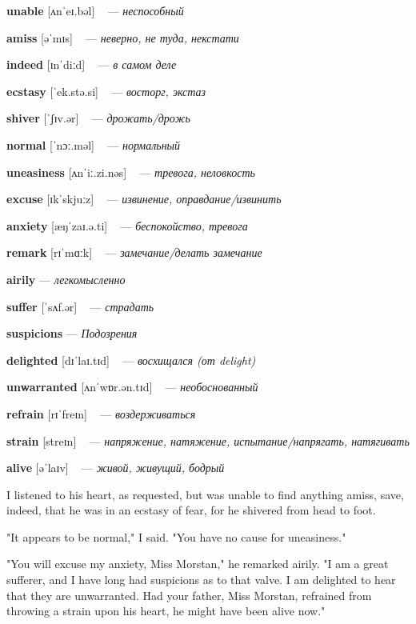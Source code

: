 \documentclass[a4paper,oneside,12pt]{amsart}
\begin{document}
{\large 

 {\bf unable } [ʌnˈeɪ.bəl] ~ --- \emph{ неспособный }

{\bf amiss } [əˈmɪs] ~ --- \emph{ неверно, не туда, некстати }

{\bf indeed } [ɪnˈdiːd] ~ --- \emph{ в самом деле }

{\bf ecstasy } [ˈek.stə.si] ~ --- \emph{ восторг, экстаз }

{\bf shiver } [ˈʃɪv.ər] ~ --- \emph{ дрожать/дрожь }

{\bf normal } [ˈnɔː.məl] ~ --- \emph{ нормальный }

{\bf uneasiness } [ʌnˈiː.zi.nəs] ~ --- \emph{ тревога, неловкость }

{\bf excuse } [ɪkˈskjuːz] ~ --- \emph{ извинение, оправдание/извинить }

{\bf anxiety } [æŋˈzaɪ.ə.ti] ~ --- \emph{ беспокойство, тревога }

{\bf remark } [rɪˈmɑːk] ~ --- \emph{ замечание/делать замечание }

{\bf airily } --- \emph{ легкомысленно }

{\bf suffer } [ˈsʌf.ər] ~ --- \emph{ страдать }

{\bf suspicions } --- \emph{ Подозрения }

{\bf delighted } [dɪˈlaɪ.tɪd] ~ --- \emph{ восхищался (от delight) }

{\bf unwarranted } [ʌnˈwɒr.ən.tɪd] ~ --- \emph{ необоснованный }

{\bf refrain } [rɪˈfreɪn] ~ --- \emph{ воздерживаться }

{\bf strain } [streɪn] ~ --- \emph{ напряжение, натяжение, испытание/напрягать, натягивать }

{\bf alive } [əˈlaɪv] ~ --- \emph{ живой, живущий, бодрый }

} \vspace{6mm} {\Large 

 
I listened to his heart, as requested, but was unable to find anything amiss, save, indeed, that he was in an ecstasy of fear, for he shivered from head to foot.

"It appears to be normal," I said. "You have no cause for uneasiness."

"You will excuse my anxiety, Miss Morstan," he remarked airily. "I am a great sufferer, and I have long had suspicions as to that valve. I am delighted to hear that they are unwarranted. Had your father, Miss Morstan, refrained from throwing a strain upon his heart, he might have been alive now."
\\ } 
\end{document}
